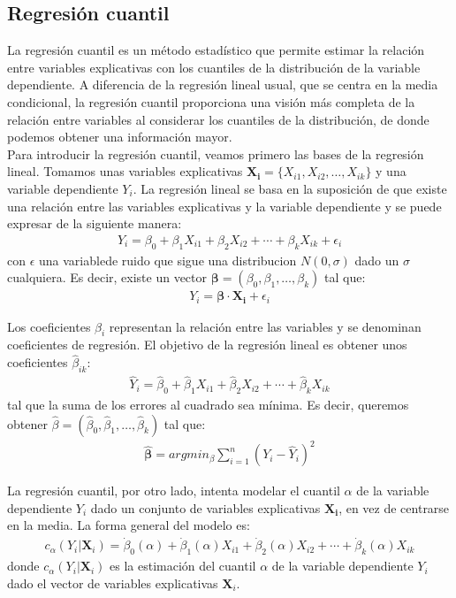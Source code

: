 \documentclass[11pt]{book}
\theoremstyle{plain} %
\theoremstyle{definition} %
\begin{document}
\subsection{Regresión cuantil}
La regresión cuantil es un método estadístico que permite estimar la 
relación entre variables explicativas con los cuantiles de la distribución 
de la variable dependiente. A diferencia de la regresión lineal usual, 
que se centra en la media condicional, la regresión cuantil proporciona una 
visión más completa de la relación entre variables al considerar los cuantiles 
de la distribución, de donde podemos obtener una información mayor.\\

Para introducir la regresión cuantil, veamos primero las bases de la regresión 
lineal. Tomamos unas variables explicativas $\mathbf{X_i} = \{X_{i1}, X_{i2}, \dots, X_{ik}\}$ 
y una variable dependiente $Y_i$. La regresión lineal se basa en la suposición 
de que existe una relación entre las variables explicativas y la variable 
dependiente  y se puede expresar de la siguiente manera:
\begin{align*}
    Y_i = \beta_0 + \beta_1X_{i1}+\beta_2X_{i2}+ \cdots + \beta_k X_{ik}+\epsilon_i
\end{align*}
con $\epsilon$ una variablede ruido que sigue una distribucion $N(0, \sigma)$
dado un $\sigma$ cualquiera. Es decir, existe un vector 
$\mathbf{\beta} = (\beta_0, \beta_1, \dots, \beta_k)$ tal que:
\begin{align*}
    Y_i = \mathbf{\beta} \cdot \mathbf{X_i} + \epsilon_i
\end{align*}

Los coeficientes $\beta_i$ representan la relación entre las variables y se 
denominan coeficientes de regresión. El objetivo de la regresión lineal es 
obtener unos coeficientes $\hat{\beta}_{ik}$:
\begin{align*}
   \hat{Y}_i = \hat{\beta}_0 + \hat{\beta}_1X_{i1}+\hat{\beta}_2X_{i2}+\cdots + \hat{\beta}_k X_{ik}
\end{align*}
tal que la suma de los errores al cuadrado sea mínima. Es decir, queremos obtener
$\hat{\beta} = (\hat{\beta}_0, \hat{\beta}_1, \dots, \hat{\beta}_k)$ tal que: 
\begin{align*}
    \mathbf{\hat{\beta}} = argmin_{\beta}\sum_{i=1}^n(Y_i-\hat{Y}_i)^2
\end{align*}

La regresión cuantil, por otro lado, intenta modelar el cuantil $\alpha$ de la 
variable dependiente $Y_i$ dado un conjunto de variables explicativas 
$\mathbf{X_i}$, en vez de centrarse en la media. La forma general del modelo es:
\begin{align*}
    c_{\alpha}(Y_i|\mathbf{X}_i) = \dot{\beta}_0(\alpha)+ \dot{\beta}_1(\alpha)X_{i1}+ \dot{\beta}_2(\alpha)X_{i2}+\cdots +  \dot{\beta}_k(\alpha)X_{ik}
\end{align*}
donde $c_{\alpha}(Y_i|\mathbf{X}_i)$ es la estimación del cuantil $\alpha$ de la 
variable dependiente $Y_i$ dado el vector de variables explicativas 
$\mathbf{X}_i$.\\
\end{document}
